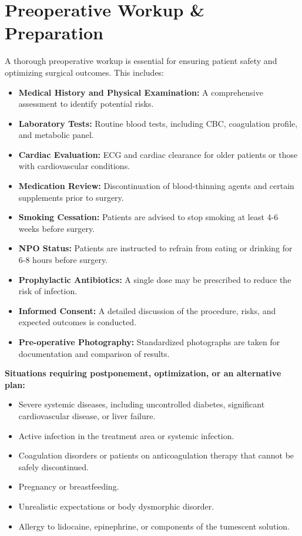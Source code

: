 \section*{Preoperative Workup \& Preparation}
A thorough preoperative workup is essential for ensuring patient safety and optimizing surgical outcomes. This includes:

\begin{itemize}
  \item \textbf{Medical History and Physical Examination:} A comprehensive assessment to identify potential risks.

  \item \textbf{Laboratory Tests:} Routine blood tests, including CBC, coagulation profile, and metabolic panel.

  \item \textbf{Cardiac Evaluation:} ECG and cardiac clearance for older patients or those with cardiovascular conditions.

  \item \textbf{Medication Review:} Discontinuation of blood-thinning agents and certain supplements prior to surgery.

  \item \textbf{Smoking Cessation:} Patients are advised to stop smoking at least 4-6 weeks before surgery.

  \item \textbf{NPO Status:} Patients are instructed to refrain from eating or drinking for 6-8 hours before surgery.

  \item \textbf{Prophylactic Antibiotics:} A single dose may be prescribed to reduce the risk of infection.

  \item \textbf{Informed Consent:} A detailed discussion of the procedure, risks, and expected outcomes is conducted.
  
  \item \textbf{Pre-operative Photography:} Standardized photographs are taken for documentation and comparison of results.
\end{itemize}

\textbf{Situations requiring postponement, optimization, or an alternative plan:}

\begin{itemize}
  \item Severe systemic diseases, including uncontrolled diabetes, significant cardiovascular disease, or liver failure.
  \item Active infection in the treatment area or systemic infection.
  \item Coagulation disorders or patients on anticoagulation therapy that cannot be safely discontinued.
  \item Pregnancy or breastfeeding.
  \item Unrealistic expectations or body dysmorphic disorder.
  \item Allergy to lidocaine, epinephrine, or components of the tumescent solution.
\end{itemize}

